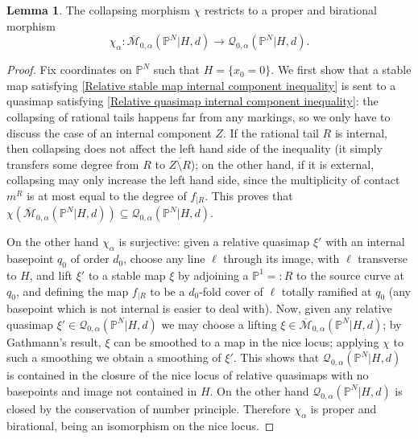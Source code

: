 \documentclass[11pt]{amsart}
\newcommand{\M}[4]{\overline{\mathcal{M}}_{#1,#2}(#3,#4)}
\newcommand{\Q}[4]{\mathcal{Q}_{#1,#2}(#3,#4)}
\newcommand{\PP}{\mathbb P}
\renewcommand{\to}{\rightarrow}
\theoremstyle{definition}
\newtheorem{lem}[thm]{Lemma}
\theoremstyle{definition}
\begin{document}
\begin{lem}
 The collapsing morphism $\chi$ restricts to a proper and birational morphism \[\chi_\alpha\colon \M{0}{\alpha}{\PP^N|H}{d}\to \Q{0}{\alpha}{\PP^N|H}{d}.\]
\end{lem}
\begin{proof}
 Fix coordinates on $\PP^N$ such that $H=\{x_0=0\}$. We first show that a stable map satisfying \eqref{Relative stable map internal component inequality} is sent to a quasimap satisfying \eqref{Relative quasimap internal component inequality}: the collapsing of rational tails happens far from any markings, so we only have to discuss the case of an internal component $Z$. If the rational tail $R$ is internal, then collapsing does not affect the left hand side of the inequality (it simply transfers some degree from $R$ to $\overline{Z\setminus R}$); on the other hand, if it is external, collapsing may only increase the left hand side, since the multiplicity of contact $m^R$ is at most equal to the degree of $f_{|R}$. This proves that $\chi(\M{0}{\alpha}{\PP^N|H}{d})\subseteq \Q{0}{\alpha}{\PP^N|H}{d}$.
 
 On the other hand $\chi_\alpha$ is surjective: given a relative quasimap $\xi'$ with an internal basepoint $q_0$ of order $d_0$, choose any line $\ell$ through its image, with $\ell$ transverse to $H$, and lift $\xi'$ to a stable map $\xi$ by adjoining a $\PP^1=:R$ to the source curve at $q_0$, and defining the map $f_{|R}$ to be a $d_0$-fold cover of $\ell$ totally ramified at $q_0$ (any basepoint which is not internal is easier to deal with). Now, given any relative quasimap $\xi'\in\Q{0}{\alpha}{\PP^N|H}{d}$ we may choose a lifting $\xi\in\M{0}{\alpha}{\PP^N|H}{d}$; by Gathmann's result, $\xi$ can be smoothed to a map in the nice locus; applying $\chi$ to such a smoothing we obtain a smoothing of $\xi'$. This shows that $\Q{0}{\alpha}{\PP^N|H}{d}$ is contained in the closure of the nice locus of relative quasimaps with no basepoints and image not contained in $H$. On the other hand $\Q{0}{\alpha}{\PP^N|H}{d}$ is closed by the conservation of number principle. Therefore $\chi_\alpha$ is proper and birational, being an isomorphism on the nice locus.
\end{proof}
\end{document}

